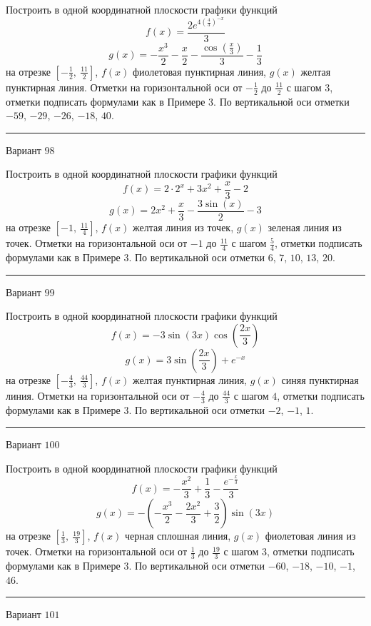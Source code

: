 \documentclass[11pt]{report}
\begin{document}
Построить в одной координатной плоскости графики функций $$f(x) = \frac{2 e^{4 \left(\frac{4}{3}\right)^{- x}}}{3}$$ $$g(x) = - \frac{x^{3}}{2} - \frac{x}{2} - \frac{\cos{\left(\frac{x}{3} \right)}}{3} - \frac{1}{3}$$ на отрезке $\left[- \frac{1}{2}, \  \frac{11}{2}\right]$, $f(x)$ фиолетовая пунктирная линия, $g(x)$ желтая пунктирная линия. Отметки на горизонтальной оси от $- \frac{1}{2}$ до $\frac{11}{2}$ с шагом $3$, отметки подписать формулами как в Примере 3. По вертикальной оси отметки $-59$, $-29$, $-26$, $-18$, $40$.
\begin{center}
\noindent\rule{8cm}{0.4pt}
\end{center}
Вариант $98$


Построить в одной координатной плоскости графики функций $$f(x) = 2 \cdot 2^{x} + 3 x^{2} + \frac{x}{3} - 2$$ $$g(x) = 2 x^{2} + \frac{x}{3} - \frac{3 \sin{\left(x \right)}}{2} - 3$$ на отрезке $\left[-1, \  \frac{11}{4}\right]$, $f(x)$ желтая линия из точек, $g(x)$ зеленая линия из точек. Отметки на горизонтальной оси от $-1$ до $\frac{11}{4}$ с шагом $\frac{5}{4}$, отметки подписать формулами как в Примере 3. По вертикальной оси отметки $6$, $7$, $10$, $13$, $20$.
\begin{center}
\noindent\rule{8cm}{0.4pt}
\end{center}
Вариант $99$


Построить в одной координатной плоскости графики функций $$f(x) = - 3 \sin{\left(3 x \right)} \cos{\left(\frac{2 x}{3} \right)}$$ $$g(x) = 3 \sin{\left(\frac{2 x}{3} \right)} + e^{- x}$$ на отрезке $\left[- \frac{4}{3}, \  \frac{44}{3}\right]$, $f(x)$ желтая пунктирная линия, $g(x)$ синяя пунктирная линия. Отметки на горизонтальной оси от $- \frac{4}{3}$ до $\frac{44}{3}$ с шагом $4$, отметки подписать формулами как в Примере 3. По вертикальной оси отметки $-2$, $-1$, $1$.
\begin{center}
\noindent\rule{8cm}{0.4pt}
\end{center}
Вариант $100$


Построить в одной координатной плоскости графики функций $$f(x) = - \frac{x^{2}}{3} + \frac{1}{3} - \frac{e^{- \frac{x}{3}}}{3}$$ $$g(x) = - \left(- \frac{x^{3}}{2} - \frac{2 x^{2}}{3} + \frac{3}{2}\right) \sin{\left(3 x \right)}$$ на отрезке $\left[\frac{1}{3}, \  \frac{19}{3}\right]$, $f(x)$ черная сплошная линия, $g(x)$ фиолетовая линия из точек. Отметки на горизонтальной оси от $\frac{1}{3}$ до $\frac{19}{3}$ с шагом $3$, отметки подписать формулами как в Примере 3. По вертикальной оси отметки $-60$, $-18$, $-10$, $-1$, $46$.
\begin{center}
\noindent\rule{8cm}{0.4pt}
\end{center}
Вариант $101$
\end{document}
